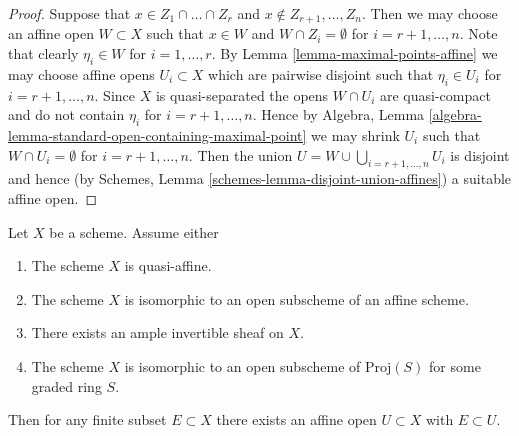 \begin{proof}
Suppose that $x \in Z_1 \cap \ldots \cap Z_r$ and
$x \not \in Z_{r + 1}, \ldots, Z_n$. Then we may choose
an affine open $W \subset X$ such that
$x \in W$ and $W \cap Z_i = \emptyset$ for
$i = r + 1, \ldots, n$. Note that clearly $\eta_i \in W$
for $i = 1, \ldots, r$. By Lemma \ref{lemma-maximal-points-affine}
we may choose affine opens $U_i \subset X$ which are pairwise
disjoint such that $\eta_i \in U_i$ for $i = r + 1, \ldots, n$.
Since $X$ is quasi-separated the opens $W \cap U_i$
are quasi-compact and do not contain $\eta_i$ for
$i = r + 1, \ldots, n$. Hence by
Algebra, Lemma \ref{algebra-lemma-standard-open-containing-maximal-point}
we may shrink $U_i$ such that $W \cap U_i = \emptyset$
for $i = r + 1, \ldots, n$. Then the union
$U = W \cup \bigcup_{i = r + 1, \ldots, n} U_i$ is disjoint and hence
(by Schemes, Lemma \ref{schemes-lemma-disjoint-union-affines})
a suitable affine open.
\end{proof}

\begin{lemma}
\label{lemma-ample-finite-set-in-affine}
Let $X$ be a scheme. Assume either
\begin{enumerate}
\item The scheme $X$ is quasi-affine.
\item The scheme $X$ is isomorphic to an open subscheme of an affine scheme.
\item There exists an ample invertible sheaf on $X$.
\item The scheme $X$ is isomorphic to an open subscheme
of $\text{Proj}(S)$ for some graded ring $S$.
\end{enumerate}
Then for any finite subset $E \subset X$ there exists an
affine open $U \subset X$ with $E \subset U$.
\end{lemma}

